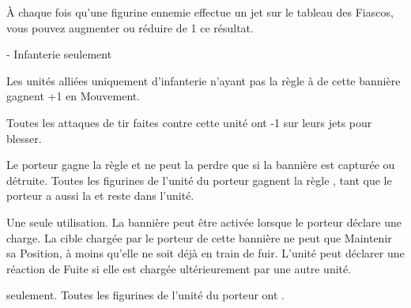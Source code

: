{À chaque fois qu'une figurine ennemie effectue un jet sur le tableau des Fiascos, vous pouvez augmenter ou réduire de 1 ce résultat.}

\endpricelist

\armymagicalbanners

\startpricelist

 - Infanterie seulement

{Les unités alliées uniquement d'infanterie n'ayant pas la règle \skirmisher à  de cette bannière gagnent +1 en Mouvement.}


{Toutes les attaques de tir faites contre cette unité ont -1 sur leurs jets pour blesser.}


{Le porteur gagne la règle \frenzy et ne peut la perdre que si la bannière est capturée ou détruite. Toutes les figurines de l'unité du porteur gagnent la règle \frenzy, tant que le porteur a aussi la \frenzy et reste dans l'unité.}


{Une seule utilisation. La bannière peut être activée lorsque le porteur déclare une charge.} {La cible} chargée par le porteur de cette bannière ne peut que Maintenir sa Position, à moins qu'elle ne soit déjà en train de fuir. {L'unité peut déclarer une réaction de Fuite si elle est chargée ultérieurement par une autre unité.}


{ seulement. Toutes les figurines de l'unité du porteur ont \poisonedattacks.}

\endpricelist

\closearmymagicalitems






\quickrefsheettitle



\specialshootingweapon


